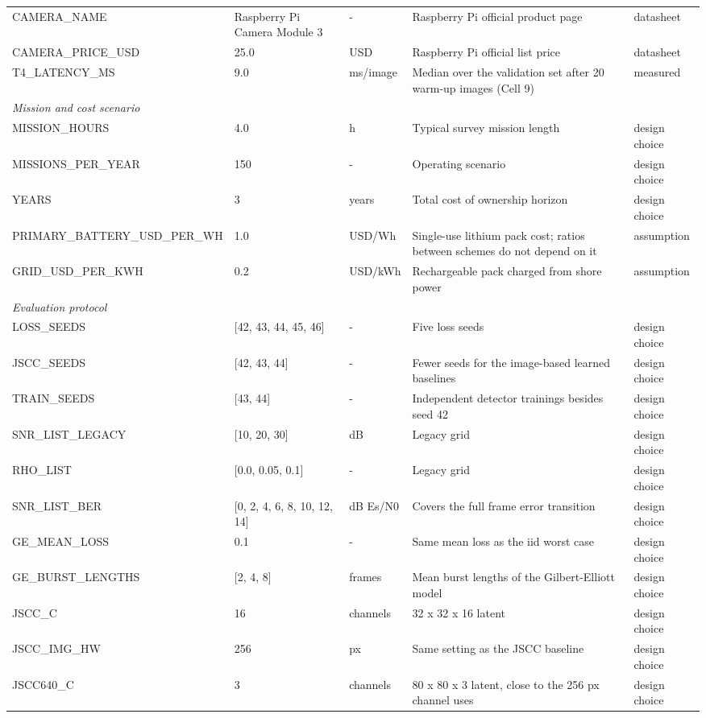 \begin{table}[t]
\begin{tabular}{p{3.3cm}p{2.6cm}p{1.6cm}p{6.6cm}p{2.0cm}}
CAMERA\_NAME & Raspberry Pi Camera Module 3 & - & Raspberry Pi official product page & datasheet \\
CAMERA\_PRICE\_USD & 25.0 & USD & Raspberry Pi official list price & datasheet \\
T4\_LATENCY\_MS & 9.0 & ms/image & Median over the validation set after 20 warm-up images (Cell 9) & measured \\
\multicolumn{5}{l}{\textit{Mission and cost scenario}} \\
MISSION\_HOURS & 4.0 & h & Typical survey mission length & design choice \\
MISSIONS\_PER\_YEAR & 150 & - & Operating scenario & design choice \\
YEARS & 3 & years & Total cost of ownership horizon & design choice \\
PRIMARY\_BATTERY\_USD\_PER\_WH & 1.0 & USD/Wh & Single-use lithium pack cost; ratios between schemes do not depend on it & assumption \\
GRID\_USD\_PER\_KWH & 0.2 & USD/kWh & Rechargeable pack charged from shore power & assumption \\
\multicolumn{5}{l}{\textit{Evaluation protocol}} \\
LOSS\_SEEDS & [42, 43, 44, 45, 46] & - & Five loss seeds & design choice \\
JSCC\_SEEDS & [42, 43, 44] & - & Fewer seeds for the image-based learned baselines & design choice \\
TRAIN\_SEEDS & [43, 44] & - & Independent detector trainings besides seed 42 & design choice \\
SNR\_LIST\_LEGACY & [10, 20, 30] & dB & Legacy grid & design choice \\
RHO\_LIST & [0.0, 0.05, 0.1] & - & Legacy grid & design choice \\
SNR\_LIST\_BER & [0, 2, 4, 6, 8, 10, 12, 14] & dB Es/N0 & Covers the full frame error transition & design choice \\
GE\_MEAN\_LOSS & 0.1 & - & Same mean loss as the iid worst case & design choice \\
GE\_BURST\_LENGTHS & [2, 4, 8] & frames & Mean burst lengths of the Gilbert-Elliott model & design choice \\
JSCC\_C & 16 & channels & 32 x 32 x 16 latent & design choice \\
JSCC\_IMG\_HW & 256 & px & Same setting as the JSCC baseline & design choice \\
JSCC640\_C & 3 & channels & 80 x 80 x 3 latent, close to the 256 px channel uses & design choice \\

\end{tabular}
\end{table}
